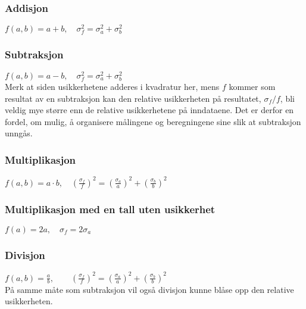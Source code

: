 \documentclass[a4paper,norsk,12pt]{article}
\begin{document}
\subsubsection*{Addisjon}
$f(a,b) = a + b,\quad	\sigma_f^2 = \sigma_a^2 + \sigma_b^2$
\subsubsection*{Subtraksjon}
$f(a,b) = a - b, \quad	\sigma_f^2 = \sigma_a^2 + \sigma_b^2$ \\
Merk at siden usikkerhetene adderes i kvadratur her, mens $f$ kommer som resultat av en subtraksjon kan den relative usikkerheten på resultatet, $\sigma_f/f$, bli veldig mye større enn de relative usikkerhetene på inndataene. Det er derfor en fordel, om mulig, å organisere målingene og beregningene sine slik at subtraksjon unngås.
\subsubsection*{Multiplikasjon}
$f(a,b) = a\cdot b, 
\quad  \left(\frac{\sigma_f}{f}\right)^2 = \left(\frac{\sigma_a}{a}\right)^2 + \left(\frac{\sigma_b}{b}\right)^2$
\subsubsection*{Multiplikasjon med en tall uten usikkerhet}
$f(a) = 2a, \quad \sigma_f = 2\sigma_a$
\subsubsection*{Divisjon}
$f(a,b) = \frac{a}{b}, \quad 
\quad  \left(\frac{\sigma_f}{f}\right)^2 = \left(\frac{\sigma_a}{a}\right)^2 + \left(\frac{\sigma_b}{b}\right)^2$\\
På samme måte som subtraksjon vil også divisjon kunne blåse opp den relative usikkerheten.
\end{document}
